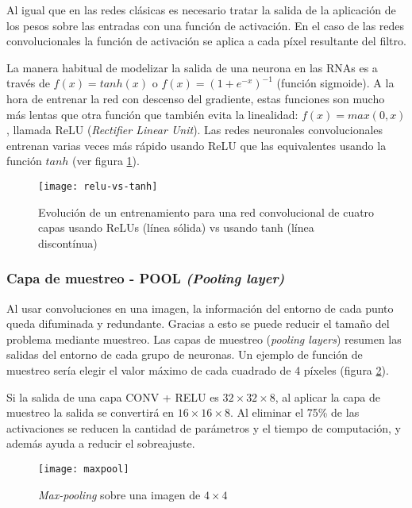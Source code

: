 Al igual que en las redes clásicas es necesario tratar la salida de la
aplicación de los pesos sobre las entradas con una función de activación. En el
caso de las redes convolucionales la función de activación se aplica a cada
píxel resultante del filtro.

La manera habitual de modelizar la salida de una neurona en las RNAs es a
través de $f(x) = tanh(x)$ o $f(x) = (1 + e^{-x})^{-1}$ (función sigmoide). A
la hora de entrenar la red con descenso del gradiente, estas funciones son
mucho más lentas que otra función que también evita la linealidad: $f(x) =
max(0, x)$, llamada ReLU (\textit{Rectifier Linear Unit}). Las redes neuronales
convolucionales entrenan varias veces más rápido usando ReLU  que las
equivalentes usando la función $tanh$ (ver figura \ref{relu-vs-tanh}).

\begin{figure}
    \centering
    \caption{Evolución de un entrenamiento para una red convolucional de cuatro capas usando ReLUs (línea sólida) vs usando tanh (línea discontínua) \parencite{krizhevsky2012imagenet}}
  \label{relu-vs-tanh}
  \texttt{[image: relu-vs-tanh]}
\end{figure}

\subsubsection{Capa de muestreo - POOL \textit{(Pooling layer)}}

Al usar convoluciones en una imagen, la información del entorno de cada punto
queda difuminada y redundante. Gracias a esto se puede reducir el tamaño del
problema mediante muestreo. Las capas de muestreo (\textit{pooling layers})
resumen las salidas del entorno de cada grupo de neuronas. Un ejemplo de
función de muestreo sería elegir el valor máximo de cada cuadrado de 4 píxeles
(figura \ref{maxpool}).

Si la salida de una capa CONV + RELU es $32 \times 32 \times 8$, al aplicar la capa de muestreo la salida se convertirá en $16 \times 16 \times 8$. Al eliminar el 75\% de las activaciones se reducen la cantidad de parámetros y el tiempo de computación, y además ayuda a reducir el sobreajuste.

\begin{figure}
    \centering
    \caption{\textit{Max-pooling} sobre una imagen de $4\times4$}
  \label{maxpool}
  \texttt{[image: maxpool]}
\end{figure}

